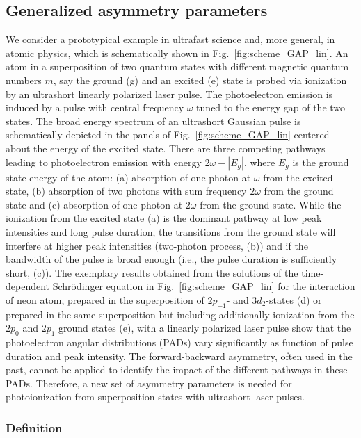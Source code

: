 \subsection{Generalized asymmetry parameters}
We consider a prototypical example in ultrafast science and, more general, in atomic physics, which is schematically shown in Fig.~\ref{fig:scheme_GAP_lin}. 
An atom in a superposition of two quantum states with different magnetic quantum numbers $m$, say the ground (g) and an excited (e) state is probed via ionization by an ultrashort linearly polarized laser pulse. The photoelectron emission is induced by a pulse with central frequency $\omega$ tuned to the energy gap of the two states. The broad energy spectrum of an ultrashort Gaussian pulse is schematically depicted in the panels of Fig.~\ref{fig:scheme_GAP_lin} centered about the energy of the excited state. There are three competing pathways leading to photoelectron emission with energy $2\omega - |E_g|$, where $E_g$ is the ground state energy of the atom: (a) absorption of one photon at $\omega$ from the
excited state, (b) absorption of two photons with sum frequency $2\omega$ from the 
ground state and (c) absorption of one photon at $2\omega$ from the ground state. While the ionization from the excited state (a) is the dominant pathway at low peak intensities and long pulse duration, the transitions from the ground state will interfere at higher peak intensities (two-photon process, (b)) and if the bandwidth of the pulse is broad enough (i.e., the pulse duration is sufficiently short, (c)). 
The exemplary results obtained from the solutions of the time-dependent Schr\"odinger equation in Fig.\ \ref{fig:scheme_GAP_lin} for the interaction of
neon atom, prepared in the superposition of $2p_{-1}$- and $3d_2$-states (d) or prepared in the same superposition but including additionally ionization from the $2p_0$ and $2p_1$ ground states (e), with a linearly polarized laser pulse show that the photoelectron angular distributions (PADs) vary significantly as function of pulse duration and peak intensity. 
The forward-backward asymmetry, often used in the past, cannot be applied to
identify the impact of the different pathways in these PADs. Therefore, a new set of asymmetry parameters is needed for photoionization from superposition states with ultrashort laser pulses.

\subsubsection{Definition}

